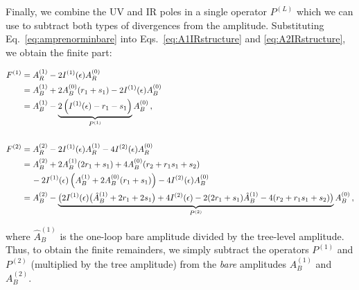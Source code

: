 \documentclass[main.tex]{subfiles}
\begin{document}
Finally, we combine the UV and IR poles in a single operator $P^{(L)}$ which we can use to subtract both types of divergences from the amplitude. Substituting Eq.~\ref{eq:amprenorminbare} into Eqs.~\ref{eq:A1IRstructure} and \ref{eq:A2IRstructure}, we obtain the finite part:
\hspace{-9.2cm}
\begin{minipage}[t]{16cm}
\begin{align}
    F^{(1)} &= A_R^{(1)} - 2 I^{(1)}(\epsilon) A_R^{(0)} \nonumber \\
            &= A_B^{(1)} + 2 A_B^{(0)}(r_1 + s_1) - 2 I^{(1)}(\epsilon) A_B^{(0)} \nonumber \\
            &= A_B^{(1)} - \underbrace{2 \left(I^{(1)}(\epsilon) - r_1 - s_1 \right)}_{P^{(1)}} A_B^{(0)} \,, \\
            &\nonumber \\
    F^{(2)} &= A_R^{(2)} - 2 I^{(1)}(\epsilon) A_R^{(1)} - 4 I^{(2)}(\epsilon) A_R^{(0)} \nonumber \\
            &= A_B^{(2)} + 2 A_B^{(1)}(2r_1 + s_1) + 4A_B^{(0)} (r_2 + r_1 s_1 + s_2) \nonumber \\
            & \quad \, -2 I^{(1)}(\epsilon) \left(A_B^{(1)} + 2 A_B^{(0)}(r_1 + s_1)\right) - 4 I^{(2)}(\epsilon) A_B^{(0)} \nonumber \\
            &= A_B^{(2)} - \underbrace{\big(2 I^{(1)}(\epsilon) \big(\hat{A}_B^{(1)} + 2 r_1 + 2 s_1\big) +4I^{(2)}(\epsilon) -2 (2r_1 + s_1) \hat{A}_B^{(1)} -  4(r_2 + r_1 s_1 + s_2) \big)}_{P^{(2)}} A_B^{(0)}\,,
\end{align}
\end{minipage}
where $\hat{A}_B^{(1)}$ is the one-loop bare amplitude divided by the tree-level amplitude. Thus, to obtain the finite remainders, we simply subtract the operators $P^{(1)}$ and $P^{(2)}$ (multiplied by the tree amplitude) from the \textit{bare} amplitudes $A^{(1)}_B$ and $A^{(2)}_B$.
\end{document}
